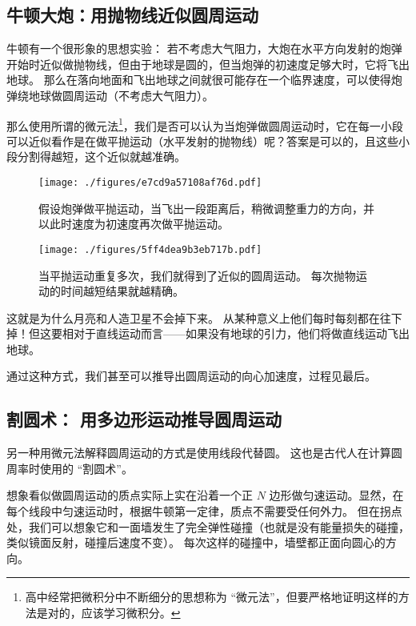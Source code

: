 

\begin{issues}
\issueDraft
\end{issues}

\subsection{牛顿大炮：用抛物线近似圆周运动}
牛顿有一个很形象的思想实验： 若不考虑大气阻力，大炮在水平方向发射的炮弹开始时近似做抛物线，但由于地球是圆的，但当炮弹的初速度足够大时，它将飞出地球。 那么在落向地面和飞出地球之间就很可能存在一个临界速度，可以使得炮弹绕地球做圆周运动（不考虑大气阻力）。


那么使用所谓的微元法\footnote{高中经常把微积分中不断细分的思想称为 “微元法”，但要严格地证明这样的方法是对的，应该学习微积分。}，我们是否可以认为当炮弹做圆周运动时，它在每一小段可以近似看作是在做平抛运动（水平发射的抛物线）呢？答案是可以的，且这些小段分割得越短，这个近似就越准确。


\begin{figure}[ht]
\centering
\texttt{[image: ./figures/e7cd9a57108af76d.pdf]}
\caption{假设炮弹做平抛运动，当飞出一段距离后，稍微调整重力的方向，并以此时速度为初速度再次做平抛运动。} \label{fig_CMintr_1}
\end{figure}

\begin{figure}[ht]
\centering
\texttt{[image: ./figures/5ff4dea9b3eb717b.pdf]}
\caption{当平抛运动重复多次，我们就得到了近似的圆周运动。 每次抛物运动的时间越短结果就越精确。} \label{fig_CMintr_2}
\end{figure}

这就是为什么月亮和人造卫星不会掉下来。 从某种意义上他们每时每刻都在往下掉！但这要相对于直线运动而言——如果没有地球的引力，他们将做直线运动飞出地球。

通过这种方式，我们甚至可以推导出圆周运动的向心加速度，过程见最后。


\subsection{割圆术： 用多边形运动推导圆周运动}
另一种用微元法解释圆周运动的方式是使用线段代替圆。 这也是古代人在计算圆周率时使用的 “割圆术”。

想象看似做圆周运动的质点实际上实在沿着一个正 $N$ 边形做匀速运动。显然，在每个线段中匀速运动时，根据牛顿第一定律，质点不需要受任何外力。 但在拐点处，我们可以想象它和一面墙发生了完全弹性碰撞（也就是没有能量损失的碰撞，类似镜面反射，碰撞后速度不变）。 每次这样的碰撞中，墙壁都正面向圆心的方向。

